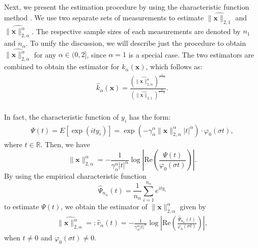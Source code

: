 \documentclass[journal,onecolumn]{IEEEtran}
\begin{document}
Next, we present the estimation procedure by using the characteristic function method \cite{l2,mh,mhl}. We use two separate sets of measurements to estimate $\widehat{\lVert\mathbf{x}\rVert_{2,1}}$ and
$\widehat{\lVert\mathbf{x}\rVert_{2,\alpha}^{\alpha}}$. The respective sample sizes of each measurements are denoted by $n_1$ and $n_{\alpha}$.
To unify the discussion, we will describe just the procedure to obtain $\widehat{\lVert\mathbf{x}\rVert_{2,\alpha}^{\alpha}}$ for any $\alpha\in(0,2]$, since $\alpha=1$ is a special case. The two estimators are combined to obtain the estimator for $k_\alpha(\mathbf{x})$, which follows as:
\begin{align}
\hat{k}_{\alpha}(\mathbf{x})=\frac{\left(\widehat{\lVert\mathbf{x}\rVert_{2,\alpha}^{\alpha}}\right)^{\frac{1}{1-\alpha}}}
{\left(\widehat{\lVert\mathbf{x}\rVert_{2,1}}\right)^{\frac{\alpha}{1-\alpha}}}.
\end{align}
\\
In fact, the characteristic function of $y_i$ has the form: \begin{align}
\Psi(t)=E[\exp(ity_i)]=\exp(-\gamma_\alpha^{\alpha}\lVert\mathbf{x}\rVert_{2,\alpha}^{\alpha}|t|^{\alpha})\cdot\varphi_0(\sigma t),
\end{align}
where $t\in\mathbb{R}$. Then, we have
$$\lVert\mathbf{x}\rVert_{2,\alpha}^{\alpha}=-\frac{1}{\gamma_\alpha^{\alpha}|t|^\alpha}\log \left|\mathrm{Re}\left(\frac{\Psi(t)}{\varphi_0(\sigma t)}\right)\right|.
$$
By using the empirical characteristic function $$\hat{\Psi}_{n_\alpha}(t)=\frac{1}{n_\alpha}\sum\limits_{i=1}^{n_\alpha}e^{ity_i}$$
to estimate $\Psi(t)$, we obtain the estimator of $\lVert\mathbf{x}\rVert_{2,\alpha}^{\alpha}$ given by \begin{align}
\widehat{\lVert\mathbf{x}\rVert_{2,\alpha}^{\alpha}}=:\hat{v}_{\alpha}(t)=-\frac{1}{\gamma_\alpha^{\alpha}|t|^\alpha}\log \left|\mathrm{Re}\left(\frac{\hat{\Psi}_{n_\alpha}(t)}{\varphi_0(\sigma t)}\right)\right|,
\end{align}
when $t\neq 0$ and $\varphi_0(\sigma t)\neq 0$. \\
\end{document}
